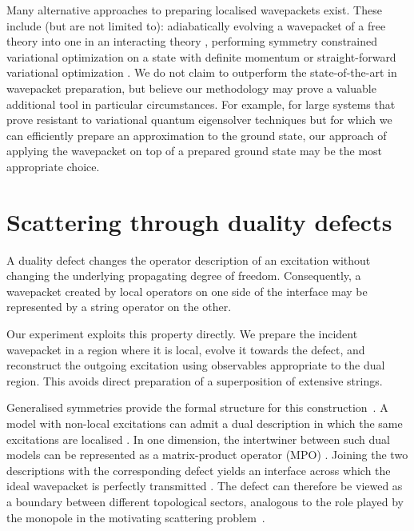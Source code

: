 Many alternative approaches to preparing localised wavepackets exist. These include (but are not limited to): adiabatically evolving a wavepacket of a free theory into one in an interacting theory \cite{jordan2012quantum, jordan2011quantum, jordan2014quantum, brennen2014multi, barata2021single}, performing symmetry constrained variational optimization on a state with definite momentum \cite{van2021real,farrell2026digital} or straight-forward variational optimization \cite{farrell2024quantum, davoudi2024scattering, zemlevskiy2025scalable}. We do not claim to outperform the state-of-the-art in wavepacket preparation, but believe our methodology may prove a valuable additional tool in particular circumstances. For example, for large systems that prove resistant to variational quantum eigensolver techniques but for which we can efficiently prepare an approximation to the ground state, our approach of applying the wavepacket on top of a prepared ground state may be the most appropriate choice.
\section{Scattering through duality defects}
\label{section:nonlocalwavepacket}
A duality defect changes the operator description of an excitation without changing the underlying propagating degree of freedom. Consequently, a wavepacket created by local operators on one side of the interface may be represented by a string operator on the other. 

Our experiment exploits this property directly. We prepare the incident wavepacket in a region where it is local, evolve it towards the defect, and reconstruct the outgoing excitation using observables appropriate to the dual region. This avoids direct preparation of a superposition of extensive strings.

Generalised symmetries provide the formal structure for this construction~\cite{shao2023noninvertible}. A model with non-local excitations can admit a dual description in which the same excitations are localised \cite{lootens2025entanglement}. In one dimension, the intertwiner between such dual models can be represented as a matrix-product operator (MPO) \cite{lootens2023dualities, lootens2024dualities}. Joining the two descriptions with the corresponding defect yields an interface across which the ideal wavepacket is perfectly transmitted \cite{ueda2025}. The defect can therefore be viewed as a boundary between different topological sectors, analogous to the role played by the monopole in the motivating scattering problem~\cite{khan2024quantumoperations}.

